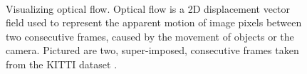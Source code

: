 \begin{figure}[t]
\begin{center}
	\\
	\caption[Visualizing optical flow]{Visualizing optical flow. Optical flow is a 2D displacement vector field used to represent the apparent motion of image pixels between two consecutive frames, caused by the movement of objects or the camera. Pictured are two, super-imposed, consecutive frames taken from the KITTI dataset \cite{geiger2013vision}.}
	\vspace{-0.65cm}
	\label{fig:optical_flow}
\end{center}
\end{figure}